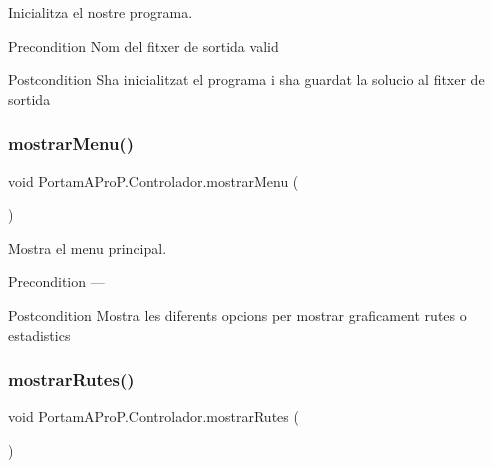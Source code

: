 Inicialitza el nostre programa. 

\begin{DoxyPrecond}{Precondition}
Nom del fitxer de sortida valid 
\end{DoxyPrecond}
\begin{DoxyPostcond}{Postcondition}
S\textquotesingle{}ha inicialitzat el programa i s\textquotesingle{}ha guardat la solucio al fitxer de sortida 
\end{DoxyPostcond}
\mbox{\label{class_portam_a_pro_p_1_1_controlador_aa1c36ea47ced882290b8be0ff569e5e1}} 
\subsubsection{\texorpdfstring{mostrar\+Menu()}{mostrarMenu()}}
{\footnotesize\ttfamily void Portam\+A\+Pro\+P.\+Controlador.\+mostrar\+Menu (\begin{DoxyParamCaption}{ }\end{DoxyParamCaption})}



Mostra el menu principal. 

\begin{DoxyPrecond}{Precondition}
--- 
\end{DoxyPrecond}
\begin{DoxyPostcond}{Postcondition}
Mostra les diferents opcions per mostrar graficament rutes o estadistics 
\end{DoxyPostcond}
\mbox{\label{class_portam_a_pro_p_1_1_controlador_ad5932831350b32e447c4156f7dc9af59}} 
\subsubsection{\texorpdfstring{mostrar\+Rutes()}{mostrarRutes()}}
{\footnotesize\ttfamily void Portam\+A\+Pro\+P.\+Controlador.\+mostrar\+Rutes (\begin{DoxyParamCaption}{ }\end{DoxyParamCaption})}



